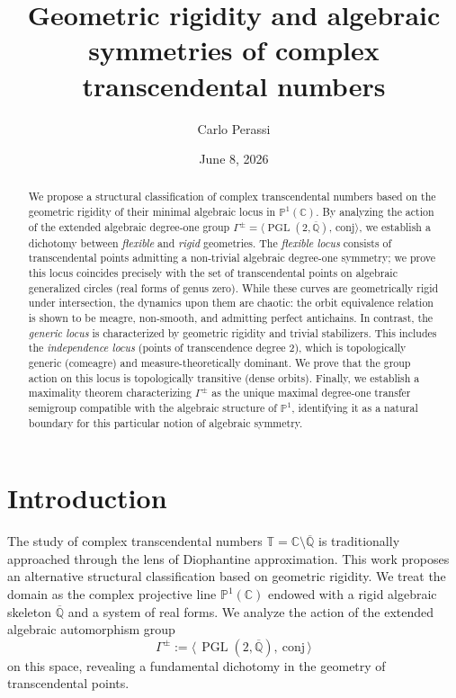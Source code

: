 \documentclass[11pt,a4paper]{article}
\title{Geometric rigidity and algebraic symmetries of complex transcendental numbers}
\author{Carlo Perassi}
\date{June 8, 2026}
\theoremstyle{plain}
\theoremstyle{definition}
\newcommand{\Alg}{\overline{\mathbb{Q}}}
\newcommand{\trans}{\mathbb{T}}
\newcommand{\Tc}{\trans}
\DeclareMathOperator{\PGL}{PGL}
\newcommand{\J}{\mathrm{conj}}
\begin{document}
\maketitle

\begin{abstract}
	We propose a structural classification of complex transcendental numbers based on the geometric rigidity of their minimal algebraic locus in $\mathbb{P}^1(\mathbb{C})$. By analyzing the action of the extended algebraic degree-one group $\Gamma^{\pm}=\langle \PGL(2,\Alg),\,\mathrm{conj}\rangle$, we establish a dichotomy between \emph{flexible} and \emph{rigid} geometries.
	The \emph{flexible locus} consists of transcendental points admitting a non-trivial algebraic degree-one symmetry; we prove this locus coincides precisely with the set of transcendental points on algebraic generalized circles (real forms of genus zero). While these curves are geometrically rigid under intersection, the dynamics upon them are chaotic: the orbit equivalence relation is shown to be meagre, non-smooth, and admitting perfect antichains.
	In contrast, the \emph{generic locus} is characterized by geometric rigidity and trivial stabilizers. This includes the \emph{independence locus} (points of transcendence degree 2), which is topologically generic (comeagre) and measure-theoretically dominant. We prove that the group action on this locus is topologically transitive (dense orbits).
	Finally, we establish a maximality theorem characterizing $\Gamma^{\pm}$ as the unique maximal degree-one transfer semigroup compatible with the algebraic structure of $\mathbb{P}^1$, identifying it as a natural boundary for this particular notion of algebraic symmetry.
\end{abstract}


\section{Introduction}\label{sec:introduction}
The study of complex transcendental numbers $\Tc = \mathbb{C} \setminus \Alg$ is traditionally approached through the lens of Diophantine approximation. This work proposes an alternative structural classification based on geometric rigidity. We treat the domain as the complex projective line $\mathbb{P}^1(\mathbb{C})$ endowed with a rigid algebraic skeleton $\Alg$ and a system of real forms. We analyze the action of the extended algebraic automorphism group
\[
	\Gamma^{\pm}:=\langle\,\PGL(2,\Alg),\ \J\,\rangle
\]
on this space, revealing a fundamental dichotomy in the geometry of transcendental points.
\end{document}
